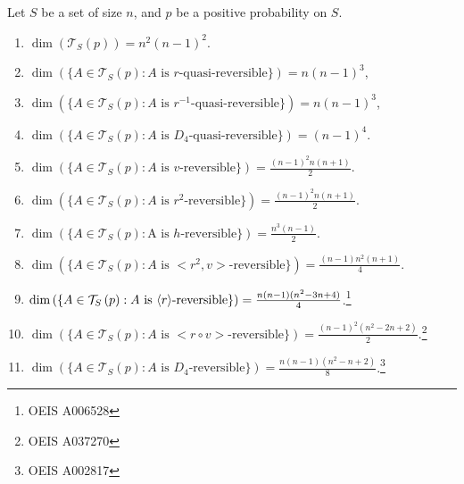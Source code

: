 \documentclass[AHL,Unicode,longabstracts]{cedram}
\DeclarePairedDelimiter{\vect}{\langle}{\rangle}
\newcounter{a}
\newcommand{\triang}[2]{\mathcal{T}_{#1} \left(#2 \right)}
\begin{document}
\begin{theo}\label{theo:dim}
Let $S$ be a set of size $n$, and $p$ be a positive probability on $S$.
\begin{enumerate}
\item \label{list9.6.1}$\dim \left(\triang{S}{p} \right) = n^2 (n-1)^2$.
\item \label{list9.6.2}$\dim \left(\{A \in \triang{S}{p} : \text{$A$ is $r$-quasi-reversible}\} \right) = n (n-1)^3$,
\item \label{list9.6.3}$\dim \left(\{A \in \triang{S}{p} : \text{$A$ is $r^{-1}$-quasi-reversible}\} \right) = n (n-1)^3$,
\item \label{list9.6.4}$\dim \left(\{A \in \triang{S}{p} : \text{$A$ is $D_4$-quasi-reversible}\} \right) = (n-1)^4$.
\item \label{list9.6.5}$ \dim \left(\{A \in \triang{S}{p} : \text{$A$ is $v$-reversible}\} \right) = \frac{(n-1)^2 n (n+1)}{2}$.
\item \label{list9.6.6}$ \dim \left(\{A \in \triang{S}{p} : \text{$A$ is $r^2$-reversible}\} \right) = \frac{(n-1)^2 n (n+1)}{2}$.
\item \label{list9.6.7}$ \dim \left(\{A \in \triang{S}{p} : \text{A is $h$-reversible}\} \right) = \frac{n^3 (n-1)}{2}$.
\item \label{list9.6.8}$ \dim \left(\{A \in \triang{S}{p} : \text{$A$ is $<r^2,v>$-reversible}\} \right) = \frac{(n-1) n^2 (n+1)}{4}$.
\item \label{list9.6.9}$ \dim \left(\{A \in \triang{S}{p} : \text{$A$ is $\vect{r}$-reversible}\} \right) = \frac{n(n-1) (n^2-3n+4)}{4}$.\footnote{OEIS A006528}
\item \label{list9.6.10}$ \dim \left(\{A \in \triang{S}{p} : \text{$A$ is $<r \circ v>$-reversible}\} \right) = \frac{(n-1)^2(n^2-2n+2)}{2}$.\footnote{OEIS A037270}
\item \label{list9.6.11}$ \dim \left(\{A \in \triang{S}{p} : \text{$A$ is $D_4$-reversible}\} \right) = \frac{n(n-1)(n^2-n+2)}{8}$.\footnote{OEIS A002817}
\end{enumerate}
\end{theo}
\end{document}

